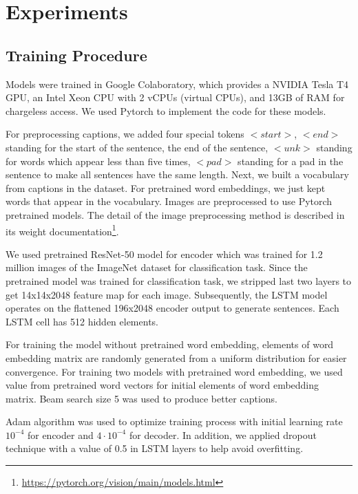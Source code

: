 \documentclass[conference]{IEEEtran}
\begin{document}
\section{Experiments\label{sec:experiment}}
\subsection{Training Procedure\label{implement}}
Models were trained in Google Colaboratory, which provides a NVIDIA Tesla T4 GPU, an Intel Xeon CPU with 2 vCPUs (virtual CPUs), and 13GB of RAM for chargeless access. We used Pytorch to implement the code for these models.  

For preprocessing captions, we added four special tokens $<start>$, $<end>$ standing for the start of the sentence, the end of the sentence, $<unk>$ standing for words which appear less than five times, $<pad>$ standing for a pad in the sentence to make all sentences have the same length. Next, we built a vocabulary from captions in the dataset. For pretrained word embeddings, we just kept words that appear in the vocabulary. Images are preprocessed to use Pytorch pretrained models. The detail of the image preprocessing method is described in its weight documentation\footnote{\url{https://pytorch.org/vision/main/models.html}}. 

We used pretrained ResNet-50 model for encoder which was trained for 1.2 million images of the ImageNet dataset for classification task. Since the pretrained model was trained for classification task, we stripped last two layers to get 14x14x2048 feature map for each image. Subsequently, the LSTM model operates on the flattened 196x2048 encoder output to generate sentences. Each LSTM cell has 512 hidden elements. 

For training the model without pretrained word embedding, elements of word embedding matrix are randomly generated from a uniform distribution for easier convergence. For training two models with pretrained word embedding, we used value from pretrained word vectors for initial elements of word embedding matrix. Beam search size 5 was used to produce better captions.

Adam algorithm\cite{kingma2014adam} was used to optimize training process with initial learning rate $10^{-4}$ for encoder and $4\cdot10^{-4}$ for decoder. In addition, we applied dropout technique with a value of 0.5 in LSTM layers to help avoid overfitting. 
\end{document}
